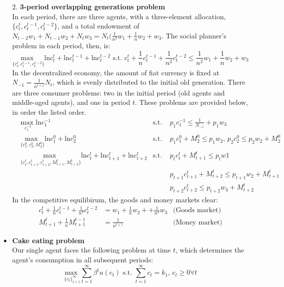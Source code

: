 \documentclass{article}
\begin{document}
\begin{itemize}
	\item[2.] \textbf{3-period overlapping generations problem}
		\medskip \\
		In each period, there are three agents, with a three-element allocation, $\{c_t^{t},c_t^{t-1},c_t^{t-2}\}$, and a total endowment of $N_{t-2}w_1+N_{t-1}w_2+N_tw_3=N_t(\frac{1}{n^2}w_1+\frac{1}{n}w_2+w_3$. The social planner's problem in each period, then, is:
		\[
			\underset{\{c_t^{t},c_t^{t-1},c_t^{t-2}\}}{\text{max }}\text{ln}c_t^{t}+\text{ln}c_t^{t-1}+\text{ln}c_t^{t-2}
				\text{ s.t. }c_t^t + \frac{1}{n}c_t^{t-1} + \frac{1}{n^2}c_t^{t-2} \leq \frac{1}{n^2}w_1+\frac{1}{n}w_2+w_3
		\]
		In the decentralized economy, the amount of fiat currency is fixed at $N_{-1}=\frac{1}{n^{t+1}}N_t$, which is evenly distributed to the initial old generation. There are three consumer problems: two in the initial period (old agents and middle-aged agents), and one in period $t$. These problems are provided below, in order the listed order.
		\begin{align*}
			&\underset{c_1^{-1}}{\text{max }}\text{ln}c_1^{-1}											 
				&\text{s.t. } &p_1c_1^{-1}	\leq \frac{1}{N_{-1}}+p_1w_3 							\\
			&\underset{\{c_1^0,c_2^0,M_2^0\}}{\text{max }}\text{ln}c_1^0+\text{ln}c_2^0						 
				&\text{s.t. } &p_1c_1^0+M_2^0 \leq p_1w_2\text{, }p_2c_2^0\leq p_2w_2 + M_2^0		\\
			&\underset{\{c_t^{t},c_{t+1}^{t},c_{t+2}^t,M^{t}_{t+1},M^{t}_{t+2}\}}{\text{max }} \text{ln}c_t^{t} + \text{ln}c_{t+1}^{t} + \text{ln}c_{t+2}^{t}
				&\text{s.t. } 	&p_tc_t^t 			+ M^{t}_{t+1}	\leq p_tw1						\\
			&	&				&p_{t+1}c^t_{t+1}	+ M^{t}_{t+2}	\leq p_{t+1}w_2+M^{t}_{t+1}		\\
			&	&				&p_{t+2}c^t_{t+2}					\leq p_{t+2}w_3+M^{t}_{t+2}	
		\end{align*}
		In the competitive equilibirum, the goods and money markets clear:
		\begin{align*}
			c_t^{t}+\frac{1}{n}c_t^{t-1}+\frac{1}{n^2}c_t^{t-2}	&= w_1+\frac{1}{n}w_2++\frac{1}{n^2}w_3	&\text{(Goods market)}	\\
			M_{t+1}^{t}+\frac{1}{n}M_{t+1}^{t-1}				&= \frac{1}{n^{t+1}}					&\text{(Money market)}	
		\end{align*}
		
	\item \textbf{Cake eating problem}
		\medskip \\
		Our single agent faces the following problem at time $t$, which determines the agent's consumption in all subsequent periods:
		\[
			\underset{\{c_t\}_{t=1}^\infty}{\text{max }}\sum_{t=1}^\infty \beta^t u(c_t) \text{     s.t. }\sum_{t=1}^\infty c_t = k_1\text{, }c_t\geq 0\forall t
		\]
		
\end{itemize}


\end{document}
